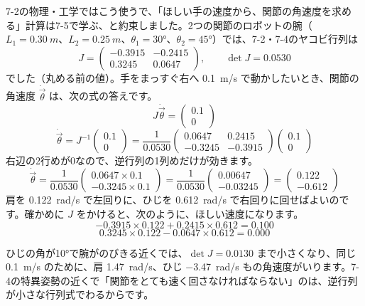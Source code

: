 \label{bk:7-5:robot}7-2の物理・工学ではこう使うで、「ほしい手の速度から、関節の角速度を求める」計算は7-5で学ぶ、と約束しました。2つの関節のロボットの腕（$L_1=\qty{0.30}{m}$、$L_2=\qty{0.25}{m}$、$\theta_1=30°$、$\theta_2=45°$）では、7-2・7-4のヤコビ行列は
\[ J=\begin{pmatrix}-0.3915&-0.2415\\0.3245&0.0647\end{pmatrix},\qquad \det J=0.0530 \]
でした（丸める前の値）。手をまっすぐ右へ \qty{0.1}{m/s} で動かしたいとき、関節の角速度 $\dot{\vec\theta}$ は、次の式の答えです。
\[ J\dot{\vec\theta}=\begin{pmatrix}0.1\\0\end{pmatrix} \]
\[ \dot{\vec\theta}=J^{-1}\begin{pmatrix}0.1\\0\end{pmatrix}=\frac{1}{0.0530}\begin{pmatrix}0.0647&0.2415\\-0.3245&-0.3915\end{pmatrix}\begin{pmatrix}0.1\\0\end{pmatrix} \]
右辺の2行めが0なので、逆行列の1列めだけが効きます。
\[ \dot{\vec\theta}=\frac{1}{0.0530}\begin{pmatrix}0.0647\times0.1\\-0.3245\times0.1\end{pmatrix}=\frac{1}{0.0530}\begin{pmatrix}0.00647\\-0.03245\end{pmatrix}=\begin{pmatrix}0.122\\-0.612\end{pmatrix} \]
肩を \qty{0.122}{rad/s} で左回りに、ひじを \qty{0.612}{rad/s} で右回りに回せばよいのです。確かめに $J$ をかけると、次のように、ほしい速度になります。
\[ -0.3915\times0.122+0.2415\times0.612=0.100 \]
\[ 0.3245\times0.122-0.0647\times0.612=0.000 \]

\noindent ひじの角が10°で腕がのびきる近くでは、$\det J=0.0130$ まで小さくなり、同じ \qty{0.1}{m/s} のために、肩 \qty{1.47}{rad/s}、ひじ \qty{-3.47}{rad/s} もの角速度がいります。7-4の特異姿勢の近くで「関節をとても速く回さなければならない」のは、逆行列が小さな行列式でわるからです。

